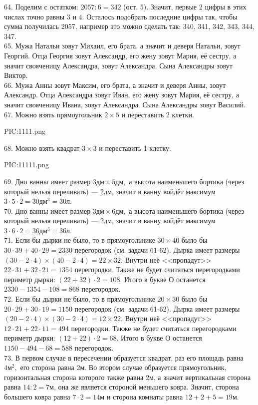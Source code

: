 64. Поделим с остатком: $2057:6=342$ (ост. 5). Значит, первые 2 цифры в этих числах точно равны 3 и 4. Осталось подобрать последние цифры так, чтобы сумма получилась 2057, например это можно сделать так: 340, 341, 342, 343, 344, 347.\\
65. Мужа Натальи зовут Михаил, его брата, а значит и деверя Натальи, зовут Георгий. Отца Георгия зовут Александр, его жену зовут Мария, её сестру, а значит свояченицу Александра, зовут Александра. Сына Александры зовут Виктор.\\
66. Мужа Анны зовут Максим, его брата, а значит и деверя Анны, зовут Александр. Отца Александра зовут Иван, его жену зовут Мария, её сестру, а значит свояченицу Ивана, зовут Александра. Сына Александры зовут Василий.\\
67. Можно взять прямоугольник $2\times5$ и переставить 2 клетки.
\begin{center}
{{PIC:1111.png}}
\end{center}
68. Можно взять квадрат $3\times3$ и переставить 1 клетку.
\begin{center}
{{PIC:11111.png}}
\end{center}
69. Дно ванны имеет размер $3\text{дм}\times5\text{дм},$ а высота наименьшего бортика (через который нельзя переливать) --- 2дм, значит в ванну войдёт максимум $3\cdot5\cdot2=30\text{дм}^3=30$л.\\
70. Дно ванны имеет размер $3\text{дм}\times6\text{дм},$ а высота наименьшего бортика (через который нельзя переливать) --- 2дм, значит в ванну войдёт максимум $3\cdot6\cdot2=36\text{дм}^3=36$л.\\
71. Если бы дырки не было, то в прямоугольнике $30\times40$ было бы $30\cdot39+40\cdot29=2330$ перегородок (см. задачи 61-62). Дырка имеет размеры $(30-2\cdot4)\times(40-2\cdot4)=22\times32.$ Внутри неё <<пропадут>> $22\cdot31+32\cdot21=1354$ перегородки. Также не будет считаться перегородками периметр дырки: $(22+32)\cdot2=108.$ Итого в букве О останется $2330-1354-108=868$ перегородок.\\
72. Если бы дырки не было, то в прямоугольнике $20\times30$ было бы $20\cdot29+30\cdot19=1150$ перегородок (см. задачи 61-62). Дырка имеет размеры $(20-2\cdot4)\times(30-2\cdot4)=12\times22.$ Внутри неё <<пропадут>> $12\cdot21+22\cdot11=494$ перегородки. Также не будет считаться перегородками периметр дырки: $(12+22)\cdot2=68.$ Итого в букве О останется $1150-494-68=588$ перегородок.\\
73. В первом случае в пересечении образуется квадрат, раз его площадь равна $4\text{м}^2,$ его сторона равна 2м. Во втором случае образуется прямоугольник, горизонтальная сторона которого также равна 2м, а значит вертикальная сторона равна $14:2=7$м, она же является стороной меньшего ковра. Значит, сторона большего ковра равна $7\cdot2=14$м и сторона комнаты равна $12+2+5=19$м.
